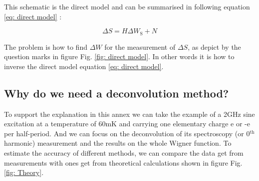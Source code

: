 This schematic is the direct model and can be summarised in following equation \eqref{eq: direct model} :

\begin{equation}
\Delta S = H\Delta W_{\mathrm{S}}+N \label{eq: direct model}
\end{equation}

The problem is how to find $\Delta W$ for the measurement of $\Delta S$, as depict by the question marks in figure Fig. \ref{fig: direct model}. In other words it is how to inverse the direct model equation \eqref{eq: direct model}.



\subsection{\texorpdfstring{Why do we need a deconvolution method?}{Why we need a deconvolution method?}}

To support the explanation in this annex we can take the example of a 2GHz sine excitation at a temperature of 60mK and carrying one elementary charge e or -e per half-period. And we can focus on the deconvolution of its spectroscopy (or 0$^{\mathrm{th}}$ harmonic) measurement and the results on the whole Wigner function. To estimate the accuracy of different methods, we can compare the data get from measurements with ones get from theoretical calculations shown in figure Fig. \ref{fig: Theory}.

